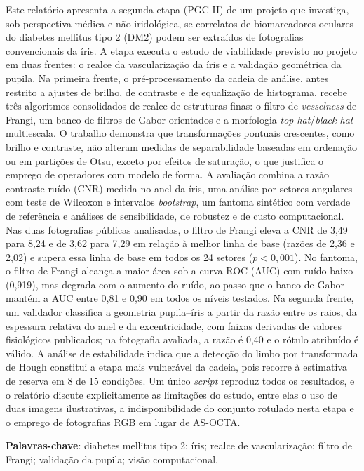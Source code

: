 \documentclass[12pt, oneside, a4paper, chapter=TITLE, section=TITLE,
               english, brazil]{abntex2}
\newcommand{\bh}{\emph{black-hat}}
\newcommand{\tht}{\emph{top-hat}}
\newcommand{\ves}{\emph{vesselness}}
\begin{document}
\begin{resumo}
Este relatório apresenta a segunda etapa (PGC II) de um projeto que
investiga, sob perspectiva médica e não iridológica, se correlatos de
biomarcadores oculares do diabetes mellitus tipo 2 (DM2) podem ser extraídos
de fotografias convencionais da íris. A etapa executa o estudo de viabilidade
previsto no projeto em duas frentes: o realce da vascularização da íris e a
validação geométrica da pupila. Na primeira frente, o pré-processamento da
cadeia de análise, antes restrito a ajustes de brilho, de contraste e de
equalização de histograma, recebe três algoritmos consolidados de realce de
estruturas finas: o filtro de \ves{} de Frangi, um banco de filtros de Gabor
orientados e a morfologia \tht{}/\bh{} multiescala. O trabalho demonstra que
transformações pontuais crescentes, como brilho e contraste, não alteram
medidas de separabilidade baseadas em ordenação ou em partições de Otsu,
exceto por efeitos de saturação, o que justifica o emprego de operadores com
modelo de forma. A avaliação combina a razão contraste-ruído (CNR) medida no
anel da íris, uma análise por setores angulares com teste de Wilcoxon e
intervalos \emph{bootstrap}, um fantoma sintético com verdade de referência e
análises de sensibilidade, de robustez e de custo computacional. Nas duas
fotografias públicas analisadas, o filtro de Frangi eleva a CNR de 3,49 para
8,24 e de 3,62 para 7,29 em relação à melhor linha de base (razões de 2,36 e
2,02) e supera essa linha de base em todos os 24 setores ($p<0{,}001$). No
fantoma, o filtro de Frangi alcança a maior área sob a curva ROC (AUC) com
ruído baixo (0,919), mas degrada com o aumento do ruído, ao passo que o banco
de Gabor mantém a AUC entre 0,81 e 0,90 em todos os níveis testados. Na
segunda frente, um validador classifica a geometria pupila--íris a partir da
razão entre os raios, da espessura relativa do anel e da excentricidade, com
faixas derivadas de valores fisiológicos publicados; na fotografia avaliada, a
razão é 0,40 e o rótulo atribuído é válido. A análise de estabilidade indica
que a detecção do limbo por transformada de Hough constitui a etapa mais
vulnerável da cadeia, pois recorre à estimativa de reserva em 8 de 15
condições. Um único \emph{script} reproduz todos os resultados, e o relatório
discute explicitamente as limitações do estudo, entre elas o uso de duas
imagens ilustrativas, a indisponibilidade do conjunto rotulado nesta etapa e
o emprego de fotografias RGB em lugar de AS-OCTA.

\vspace{\onelineskip}
\noindent\textbf{Palavras-chave}: diabetes mellitus tipo 2; íris; realce de
vascularização; filtro de Frangi; validação da pupila; visão computacional.
\end{resumo}
\end{document}
